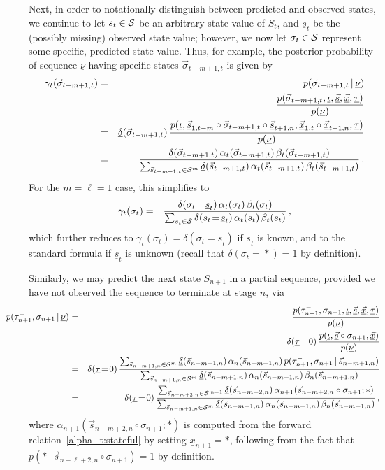 \documentclass[a4paper]{article}
\newcommand{\uv}{\underline{\nu}}
\newcommand{\vg}{\vec{\sigma}}
\newcommand{\ui}{\underline{\iota}}
\newcommand{\ut}{\underline{\tau}}
\newcommand{\tm}{\tau^{-}}
\newcommand{\vs}{\vec{s}}
\newcommand{\uvs}{\underline{\vs}}
\newcommand{\vx}{\vec{x}}
\newcommand{\uvx}{\underline{\vx}}
\newcommand{\ux}{\underline{x}}
\newcommand{\us}{\underline{s}}
\newcommand{\ud}{\underline{\delta}}
\begin{document}
Next, in order to notationally distinguish between predicted and observed states, we continue to let $s_t\in{\cal S}$ be an
arbitrary state value of $S_t$, and $\us_t$ be the (possibly missing) observed state value; however, we now let
$\sigma_t\in{\cal S}$ represent some specific, predicted state value. Thus, for example,
the posterior probability of sequence $\uv$ having specific states $\vg_{t-m+1,t}$ is given by
\begin{eqnarray}
\gamma_t(\vg_{t-m+1,t}) & = & p(\vg_{t-m+1,t}\,|\,\uv)
\nonumber\\& = &
\frac{p(\vg_{t-m+1,t},\ui,\uvs,\uvx,\ut)}{p(\uv)}
\nonumber\\& = &
\ud(\vg_{t-m+1,t})\,\frac{p(\ui,\uvs_{1,t-m}\circ\vg_{t-m+1,t}\circ\uvs_{t+1,n},\uvx_{1,t}\circ\uvx_{t+1,n},\ut)}{p(\uv)}
\nonumber\\& = &
\frac{\ud(\vg_{t-m+1,t})\,\alpha_t(\vg_{t-m+1,t})\,\beta_t(\vg_{t-m+1,t})}
{\sum_{\vs_{t-m+1,t}\in{\cal S}^{m}} \ud(\vs_{t-m+1,t})
\,\alpha_t(\vs_{t-m+1,t})\,\beta_t(\vs_{t-m+1,t})}\,.
\end{eqnarray}
For the $m=\ell=1$ case, this simplifies to
\begin{eqnarray}
\gamma_t(\sigma_{t}) & = & 
\frac{\delta(\sigma_{t}\!=\!\us_{t})\,\alpha_t(\sigma_{t})\,\beta_t(\sigma_{t})}
{\sum_{s_{t}\in{\cal S}} \delta(s_{t}\!=\!\us_{t})
\,\alpha_t(s_{t})\,\beta_t(s_{t})}\,,
\end{eqnarray}
which further reduces to $\gamma_t(\sigma_t)=\delta(\sigma_t\!=\!\us_t)$ if $\us_t$ is known, and to the standard
formula if $\us_t$ is unknown (recall that $\delta(\sigma_t\!=\!*)=1$ by definition).

Similarly, we may predict the next state $S_{n+1}$ in a partial sequence, provided we have not observed the sequence to terminate at stage $n$, via
\begin{eqnarray}
 \hspace*{-9mm} p(\tm_{n+1},\sigma_{n+1}\,|\,\uv)  
& = &
  \frac{p(\tm_{n+1},\sigma_{n+1},\ui,\uvs,\uvx,\ut)}
       {p(\uv)}
\nonumber\\& = & 
  \delta(\ut\!=\!0)\,
  \frac{p(\ui,\uvs\circ\sigma_{n+1},\uvx)}
       {p(\uv)}
\nonumber\\& = & 
  \delta(\ut\!=\!0)\,
  \frac{\sum_{\vs_{n-m+1,n}\in{\cal S}^{m}} \ud(\vs_{n-m+1,n})
\,\alpha_n(\vs_{n-m+1,n})\,p(\tm_{n+1},\sigma_{n+1}\,|\,\vs_{n-m+1,n})}
 {\sum_{\vs_{n-m+1,n}\in{\cal S}^{m}} \ud(\vs_{n-m+1,n})
\,\alpha_n(\vs_{n-m+1,n})\,\beta_n(\vs_{n-m+1,n})}
\nonumber\\& = & 
  \delta(\ut\!=\!0)\,
  \frac{\sum_{\vs_{n-m+2,n}\in{\cal S}^{m-1}} \ud(\vs_{n-m+2,n})
\,\alpha_{n+1}(\vs_{n-m+2,n}\circ\sigma_{n+1};*)}
 {\sum_{\vs_{n-m+1,n}\in{\cal S}^{m}} \ud(\vs_{n-m+1,n})
\,\alpha_n(\vs_{n-m+1,n})\,\beta_n(\vs_{n-m+1,n})}
\,,
\end{eqnarray}
where $\alpha_{n+1}(\vs_{n-m+2,n}\circ\sigma_{n+1};*)$ is computed from the forward relation~\eqref{alpha_t:stateful}
by setting $\ux_{n+1}=*$, following from the fact that  $p(*\,|\,\vs_{n-\ell+2,n}\circ\sigma_{n+1})=1$ by definition.
\end{document}
